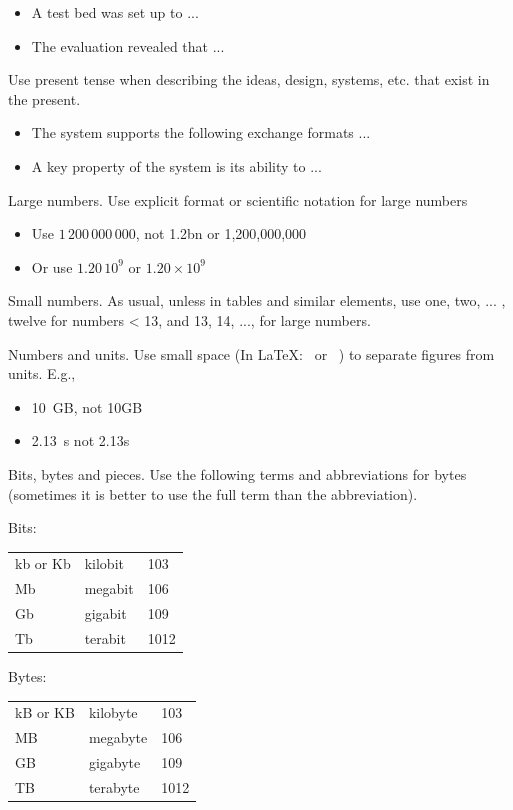 \begin{itemize}
	\item A test bed was set up to ...
	\item The evaluation revealed that ...
\end{itemize}

Use present tense when describing the ideas, design, systems, etc. that exist in the present. 

\begin{itemize}
	\item The system supports the following exchange formats ...
	\item A key property of the system is its ability to ...
\end{itemize}

Large numbers. Use explicit format or scientific notation for large numbers

\begin{itemize}
	\item Use $1\,200\,000\,000$, not 1.2bn or 1,200,000,000
	\item Or use $1.20\,10^9$ or $1.20 \times 10^9$
\end{itemize}

Small numbers. As usual, unless in tables and similar elements, use {one, two, ... , twelve} for numbers < 13, and {13, 14, ..., } for large numbers.

Numbers and units. Use small space (In \LaTeX: \, or ~) to separate figures from units. E.g.,

\begin{itemize}
	\item 10~GB, not 10GB
	\item 2.13~s not 2.13s
\end{itemize}

Bits, bytes and pieces. Use the following terms and abbreviations for bytes (sometimes it is better to use the full term than the abbreviation).

Bits:\\
\begin{tabular}{lll}
	kb or Kb&	kilobit&	103\\ 
	Mb&	megabit&	106\\ 
	Gb&	gigabit&	109\\ 
	Tb&	terabit&	1012\\ 
\end{tabular}

Bytes:\\
\begin{tabular}{lll}
	kB or KB&	kilobyte&	103\\ 
	MB&	megabyte&106\\ 
	GB	&gigabyte	&109\\ 
	TB	&terabyte	&1012\\ 
\end{tabular}

